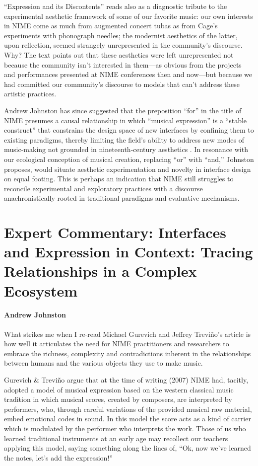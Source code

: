 ``Expression and its Discontents'' reads also as a diagnostic tribute to the experimental aesthetic framework of some of our favorite music: our own interests in NIME come as much from augmented concert tubas as from Cage's experiments with phonograph needles; the modernist aesthetics of the latter, upon reflection, seemed strangely unrepresented in the community's discourse. Why? The text points out that these aesthetics were left unrepresented not because the community isn't interested in them---as obvious from the projects and performances presented at NIME conferences then and now---but because we had committed our community's discourse to models that can't address these artistic practices. 

Andrew Johnston has since suggested that the preposition ``for'' in the title of NIME presumes a causal relationship in which ``musical expression'' is a ``stable construct'' that constrains the design space of new interfaces by confining them to existing paradigms, thereby limiting the field's ability to address new modes of music-making not grounded in nineteenth-century aesthetics \cite{Johnston:2016}. In resonance with our ecological conception of musical creation, replacing ``or'' with ``and,'' Johnston proposes, would situate aesthetic experimentation and novelty in interface design on equal footing. This is perhaps an indication that NIME still struggles to reconcile experimental and exploratory practices with a discourse anachronistically rooted in traditional paradigms and evaluative mechanisms.


\section*{Expert Commentary: Interfaces and Expression in Context: Tracing Relationships in a Complex Ecosystem}
\paragraph{Andrew Johnston}

What strikes me when I re-read Michael Gurevich and Jeffrey Trevi\~{n}o's article is how well it articulates the need for NIME practitioners and researchers to embrace the richness, complexity and contradictions inherent in the relationships between humans and the various objects they use to make music.  

Gurevich \& Trevi\~{n}o argue that at the time of writing (2007) NIME had, tacitly, adopted a model of musical expression based on the western classical music tradition in which musical scores, created by composers, are interpreted by performers, who, through careful variations of the provided musical raw material, embed emotional codes in sound.  In this model the score acts as a kind of carrier which is modulated by the performer who interprets the work.  Those of us who learned traditional instruments at an early age may recollect our teachers applying this model, saying something along the lines of, ``Ok, now we've learned the notes, let's add the expression!''

